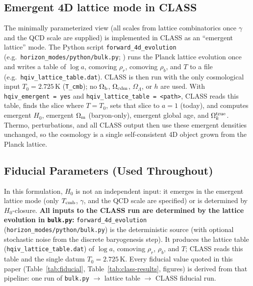\documentclass[12pt,a4paper]{article}
\begin{document}
\subsection{Emergent 4D lattice mode in CLASS}
The minimally parameterized view (all scales from lattice combinatorics once $\gamma$ and the QCD scale are supplied) is implemented in CLASS as an ``emergent lattice'' mode. The Python script \texttt{forward\_4d\_evolution} (e.g.\ \texttt{horizon\_modes/python/bulk.py}; \citep{hqiv_repo}) runs the Planck lattice evolution once and writes a table of $\log a$, comoving $\rho_r$, comoving $\rho_b$, and $T$ to a file (e.g.\ \texttt{hqiv\_lattice\_table.dat}). CLASS is then run with the only cosmological input $T_0 = 2.725$\,K (\texttt{T\_cmb}); no $\Omega_{\rm b}$, $\Omega_{\rm cdm}$, $\Omega_\Lambda$, or $h$ are used. With \texttt{hqiv\_emergent = yes} and \texttt{hqiv\_lattice\_table = <path>}, CLASS reads this table, finds the slice where $T = T_0$, sets that slice to $a = 1$ (today), and computes emergent $H_0$, emergent $\Omega_{\rm m}$ (baryon-only), emergent global age, and $\Omega_k^{\rm true}$. Thermo, perturbations, and all CLASS output then use these emergent densities unchanged, so the cosmology is a single self-consistent 4D object grown from the Planck lattice.

\subsection{Fiducial Parameters (Used Throughout)}

In this formulation, $H_0$ is not an independent input: it emerges in the emergent lattice mode (only $T_{\rm cmb}$, $\gamma$, and the QCD scale are specified) or is determined by $H_0$-closure. \textbf{All inputs to the CLASS run are determined by the lattice evolution in \texttt{bulk.py}:} \texttt{forward\_4d\_evolution} (\texttt{horizon\_modes/python/bulk.py}) is the deterministic source (with optional stochastic noise from the discrete baryogenesis step). It produces the lattice table (\texttt{hqiv\_lattice\_table.dat}) of $\log a$, comoving $\rho_r$, $\rho_b$, and $T$; CLASS reads this table and the single datum $T_0 = 2.725$\,K. Every fiducial value quoted in this paper (Table~\ref{tab:fiducial}, Table~\ref{tab:class-results}, figures) is derived from that pipeline: one run of \texttt{bulk.py} $\to$ lattice table $\to$ CLASS fiducial run.
\end{document}
